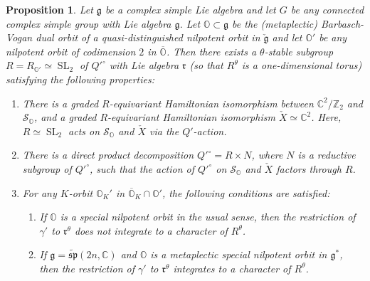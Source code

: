 \documentclass[11pt, a4paper]{amsart}
\newcommand{\C}{\mathbb{C}}
\newcommand{\orb}{\mathbb{O}}
\newcommand{\orbk}{\orb_{K}}
\newcommand{\Z}{\mathbb{Z}}
\newcommand{\fg}{\mathfrak{g}}
\newcommand{\fr}{\mathfrak{r}}
\newcommand{\ckfg}{{\check{\fg}}}
\newcommand{\fmp}{\widetilde{\mathfrak{sp}}}
\newcommand{\cS}{\mathcal{S}}
\newcommand{\SL}{\operatorname{SL}}
\newcommand{\rf}{\mathfrak{r}}
\newtheorem{Prop}[Thm]{Proposition}
\theoremstyle{definition}
\numberwithin{equation}{section}
\begin{document}
\begin{Prop}\label{prop:A1}
	Let $\fg$ be a complex simple Lie algebra and let $G$ be any connected complex simple group with Lie algebra $\fg$. Let $\orb \subset \fg$ be the (metaplectic) Barbasch-Vogan dual orbit of a quasi-distinguished nilpotent orbit in $\ckfg$ and let $\orb'$ be any nilpotent orbit of codimension $2$ in $\overline{\orb}$. Then there exists a $\theta$-stable subgroup $R=R_{\orb'} \simeq \SL_2$ of $Q'^\circ$ with Lie algebra $\rf$ (so that $R^\theta$ is a one-dimensional torus) satisfying the following properties:
	\begin{enumerate}[itemindent=*, leftmargin=*]
		\item 
		There is a graded $R$-equivariant Hamiltonian isomorphism between $\C^2 / \Z_2$ and $\cS_{\orb}$, and a graded $R$-equivariant Hamiltonian isomorphism $\check{X} \simeq \C^2$. Here, $R \simeq \SL_2$ acts on $\cS_{\orb}$ and $\check{X}$ via the $Q'$-action.
		\item 
		There is a direct product decomposition $Q'^\circ = R \times N$, where $N$ is a reductive subgroup of $Q'^\circ$, such that the action of $Q'^\circ$ on $\cS_{\orb}$ and $\check{X}$ factors through $R$.
		\item \label{item:nonadm}
		For any $K$-orbit $\orbk'$ in $\overline{\orb}_K \cap \orb'$, the following conditions are satisfied:
        \begin{enumerate}[label=(\theenumi\alph*), ref=(\theenumi\alph*), itemindent=*, leftmargin=*]
            \item \label{cond:O'_nonadm} 
			If $\orb$ is a special nilpotent orbit in the usual sense, then the restriction of $\gamma'$ to $\fr^\theta$ does not integrate to a character of $R^\theta$.
            \item \label{cond:O'_metaplectic_adm} 
			If $\fg = \fmp(2n,\C)$ and $\orb$ is a metaplectic special nilpotent orbit in $\fg^*$, then the restriction of $\gamma'$ to $\fr^\theta$ integrates to a character of $R^\theta$.
        \end{enumerate}
	\end{enumerate}
\end{Prop}
\end{document}
